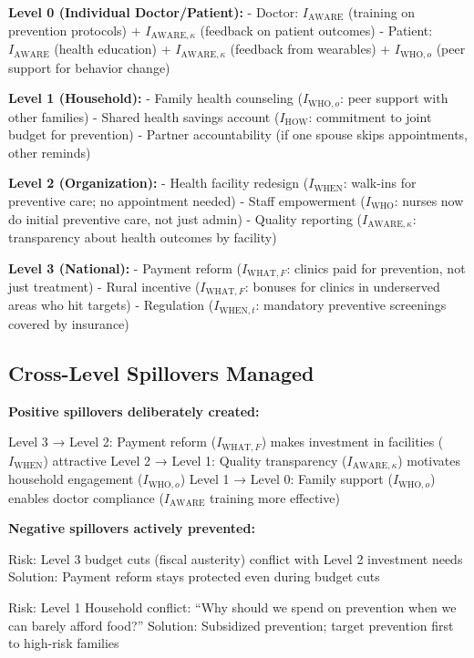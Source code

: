 \textbf{Level 0 (Individual Doctor/Patient):}
- Doctor: $I_{\text{AWARE}}$ (training on prevention protocols) + $I_{\text{AWARE},\kappa}$ (feedback on patient outcomes)
- Patient: $I_{\text{AWARE}}$ (health education) + $I_{\text{AWARE},\kappa}$ (feedback from wearables) + $I_{\text{WHO},o}$ (peer support for behavior change)

\textbf{Level 1 (Household):}
- Family health counseling ($I_{\text{WHO},o}$: peer support with other families)
- Shared health savings account ($I_{\text{HOW}}$: commitment to joint budget for prevention)
- Partner accountability (if one spouse skips appointments, other reminds)

\textbf{Level 2 (Organization):}
- Health facility redesign ($I_{\text{WHEN}}$: walk-ins for preventive care; no appointment needed)
- Staff empowerment ($I_{\text{WHO}}$: nurses now do initial preventive care, not just admin)
- Quality reporting ($I_{\text{AWARE},\kappa}$: transparency about health outcomes by facility)

\textbf{Level 3 (National):}
- Payment reform ($I_{\text{WHAT},F}$: clinics paid for prevention, not just treatment)
- Rural incentive ($I_{\text{WHAT},F}$: bonuses for clinics in underserved areas who hit targets)
- Regulation ($I_{\text{WHEN},t}$: mandatory preventive screenings covered by insurance)

\subsection{Cross-Level Spillovers Managed}

\textbf{Positive spillovers deliberately created:}

Level 3 → Level 2: Payment reform ($I_{\text{WHAT},F}$) makes investment in facilities ($I_{\text{WHEN}}$) attractive
Level 2 → Level 1: Quality transparency ($I_{\text{AWARE},\kappa}$) motivates household engagement ($I_{\text{WHO},o}$)
Level 1 → Level 0: Family support ($I_{\text{WHO},o}$) enables doctor compliance ($I_{\text{AWARE}}$ training more effective)

\textbf{Negative spillovers actively prevented:}

Risk: Level 3 budget cuts (fiscal austerity) conflict with Level 2 investment needs
Solution: Payment reform stays protected even during budget cuts

Risk: Level 1 Household conflict: ``Why should we spend on prevention when we can barely afford food?''
Solution: Subsidized prevention; target prevention first to high-risk families

